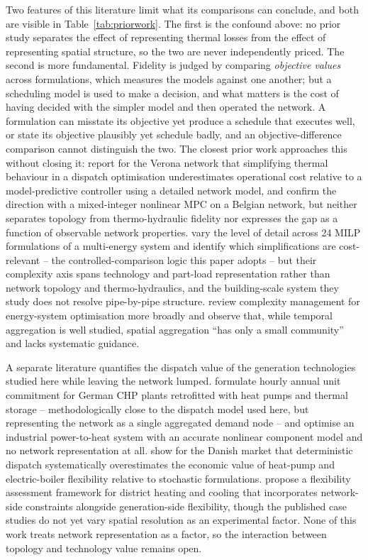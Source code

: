 Two features of this literature limit what its comparisons can conclude, and both are
visible in Table~\ref{tab:priorwork}. The first is the confound above: no prior study
separates the effect of representing thermal losses from the effect of representing
spatial structure, so the two are never independently priced. The second is more
fundamental. Fidelity is judged by comparing \emph{objective values} across formulations,
which measures the models against one another; but a scheduling model is used to make a
decision, and what matters is the cost of having decided with the simpler model and then
operated the network. A formulation can misstate its objective yet produce a schedule
that executes well, or state its objective plausibly yet schedule badly, and an
objective-difference comparison cannot distinguish the two. The closest prior work
approaches this without closing it: \citet{Quaggiotto2021} report for the Verona network
that simplifying thermal behaviour in a dispatch optimisation underestimates operational
cost relative to a model-predictive controller using a detailed network model, and
\citet{Jansen2024} confirm the direction with a mixed-integer nonlinear MPC on a Belgian
network, but neither separates topology from thermo-hydraulic fidelity nor expresses the
gap as a function of observable network properties. \citet{Wirtz2021_complexity} vary the
level of detail across 24 MILP formulations of a multi-energy system and identify which
simplifications are cost-relevant -- the controlled-comparison logic this paper adopts --
but their complexity axis spans technology and part-load representation rather than
network topology and thermo-hydraulics, and the building-scale system they study does not
resolve pipe-by-pipe structure. \citet{Kotzur2021} review complexity management for
energy-system optimisation more broadly and observe that, while temporal aggregation is
well studied, spatial aggregation ``has only a small community'' and lacks systematic
guidance.

A separate literature quantifies the dispatch value of the generation technologies
studied here while leaving the network lumped. \citet{Mollenhauer2018} formulate hourly
annual unit commitment for German CHP plants retrofitted with heat pumps and thermal
storage -- methodologically close to the dispatch model used here, but representing the
network as a single aggregated demand node -- and \citet{Walden2023} optimise an
industrial power-to-heat system with an accurate nonlinear component model and no network
representation at all. \citet{Nielsen2016} show for the Danish market that deterministic
dispatch systematically overestimates the economic value of heat-pump and electric-boiler
flexibility relative to stochastic formulations. \citet{Riedl2026} propose a flexibility
assessment framework for district heating and cooling that incorporates network-side
constraints alongside generation-side flexibility, though the published case studies do
not yet vary spatial resolution as an experimental factor. None of this work treats
network representation as a factor, so the interaction between topology and technology
value remains open.

